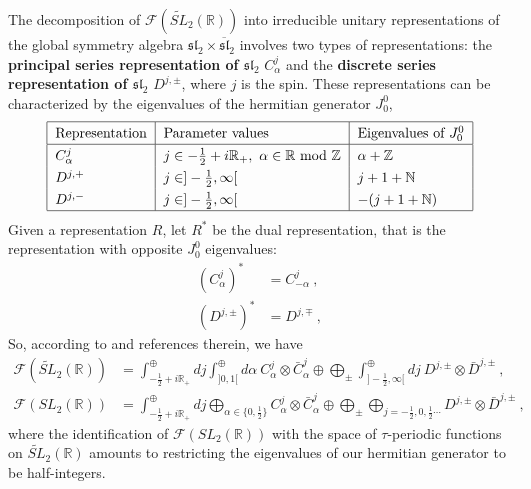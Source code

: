 \documentclass[12pt, a4paper, notitlepage, twoside]{report}
\numberwithin{equation}{section}
\theoremstyle{break}
\begin{document}
The decomposition of $\mathcal{F}(\widetilde{SL}_2(\mathbb{R}))$ into irreducible unitary representations of the global symmetry algebra $\mathfrak{sl}_2\times \overline{\mathfrak{sl}}_2$ involves two types of representations: the \textbf{\boldmath principal series representation of $\mathfrak{sl}_2$} $C^j_\alpha$ and the \textbf{\boldmath discrete series representation of $\mathfrak{sl}_2$} $D^{j,\pm}$, where $j$ is the spin. 
These representations can be characterized by the eigenvalues of the hermitian generator $J_0^0$,
\begin{align} 
\renewcommand{\arraystretch}{1.3}
\begin{tabular}{|l|l|l|}
  \hline
Representation & Parameter values & Eigenvalues of $J_0^0$
\\
\hline 
$C^j_\alpha$  & $j\in -\tfrac12+i{\mathbb{R}}_+,\ \alpha\in{\mathbb{R}}\ \text{mod}\ {\mathbb{Z}}$ &  $\alpha + {\mathbb{Z}}$ 
\\
$D^{j,+}$ & $j\in]-\tfrac12,\infty[$ & $j+1+{\mathbb{N}}$
\\
$D^{j,-}$ & $j\in]-\tfrac12,\infty[$ & $-(j+1+{\mathbb{N}})$
\\
\hline 
 \end{tabular}
\label{rpe}
\end{align}
Given a representation $R$, let $R^*$ be the dual representation, that is the representation with opposite $J_0^0$ eigenvalues:
\begin{align}
 (C^j_\alpha)^* &= C^j_{-\alpha} \ , 
\\
 (D^{j,\pm})^* &= D^{j,\mp}\ ,
\end{align}
So, according to \cite{rib09} and references therein, we have
\begin{align}
 \mathcal{F}(\widetilde{SL}_2(\mathbb{R})) &= \int^\oplus_{-\frac12+i{\mathbb{R}}_+} dj \int^\oplus_{]0,1[} d\alpha\ C^j_\alpha \otimes \bar{C}^j_{\alpha} \oplus \bigoplus_\pm \int^\oplus_{]-\frac12, \infty[} dj\ D^{j,\pm}\otimes \bar{D}^{j,\pm} \ ,
\label{fst}
\\
 \mathcal{F}(SL_2(\mathbb{R})) &= \int^\oplus_{-\frac12+i{\mathbb{R}}_+} dj \bigoplus_{\alpha\in\{0,\frac12\}} C^j_\alpha \otimes \bar{C}^j_{\alpha} \oplus \bigoplus_\pm \bigoplus_{j=-\frac12, 0,\frac12 \cdots} D^{j,\pm}\otimes \bar{D}^{j,\pm} \ ,
\end{align}
where the identification of $\mathcal{F}(SL_2(\mathbb{R}))$ with the space of $\tau$-periodic functions on $\widetilde{SL}_2(\mathbb{R})$ amounts to restricting the eigenvalues of our hermitian generator to be half-integers.
\end{document}

